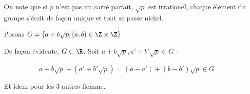 On note que si $p$ n'est pas un carré parfait, $\sqrt{p}$ est irrationel, chaque élément du groupe s'écrit de façon unique et tout se passe nickel. 

Posons  $G = \{a + b\sqrt{p}; (a,b) \in \Z \times \Z\}$

De façon évidente, $G \subset \R$. Soit $a+b\sqrt{p}, a'+b'\sqrt{p} \in G$ :

\[a+b\sqrt{p} - (a'+b'\sqrt{p}) = (a-a') + (b-b')\sqrt{p} \in G\]

Et idem pour les 3 autres flemme.